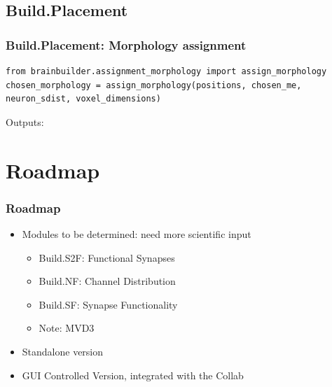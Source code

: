 \documentclass{beamer}
\begin{document}
\subsection{Build.Placement}

\begin{frame}[fragile]
  \frametitle{Build.Placement: Morphology assignment}
\begin{lstlisting}
from brainbuilder.assignment_morphology import assign_morphology
chosen_morphology = assign_morphology(positions, chosen_me, neuron_sdist, voxel_dimensions)
\end{lstlisting}
  Outputs:
\end{frame}

\section{Roadmap}
\begin{frame}
  \frametitle{Roadmap}

  \begin{itemize}
     \item Modules to be determined: need more scientific input
     \begin{itemize}
        \item Build.S2F: Functional Synapses
        \item Build.NF: Channel Distribution
        \item Build.SF: Synapse Functionality
        \item Note: MVD3
     \end{itemize}
     \item Standalone version
     \item GUI Controlled Version, integrated with the Collab
  \end{itemize}
\end{frame}
\end{document}
